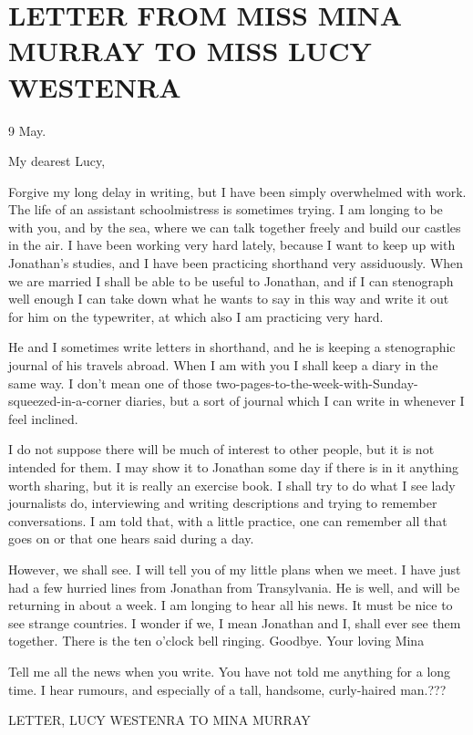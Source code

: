 \chapter{LETTER FROM MISS MINA MURRAY TO MISS LUCY WESTENRA}

9 May. 

My dearest Lucy, 

Forgive my long delay in writing, but I have been simply overwhelmed with work. The life of an assistant schoolmistress is sometimes trying. I am longing to be with you, and by the sea, where we can talk together freely and build our castles in the air. I have been working very hard lately, because I want to keep up with Jonathan's studies, and I have been practicing shorthand very assiduously. When we are married I shall be able to be useful to Jonathan, and if I can stenograph well enough I can take down what he wants to say in this way and write it out for him on the typewriter, at which also I am practicing very hard. 

He and I sometimes write letters in shorthand, and he is keeping a stenographic journal of his travels abroad. When I am with you I shall keep a diary in the same way. I don't mean one of those two-pages-to-the-week-with-Sunday-squeezed-in-a-corner diaries, but a sort of journal which I can write in whenever I feel inclined. 

I do not suppose there will be much of interest to other people, but it is not intended for them. I may show it to Jonathan some day if there is in it anything worth sharing, but it is really an exercise book. I shall try to do what I see lady journalists do, interviewing and writing descriptions and trying to remember conversations. I am told that, with a little practice, one can remember all that goes on or that one hears said during a day. 

However, we shall see. I will tell you of my little plans when we meet. I have just had a few hurried lines from Jonathan from Transylvania. He is well, and will be returning in about a week. I am longing to hear all his news. It must be nice to see strange countries. I wonder if we, I mean Jonathan and I, shall ever see them together. There is the ten o'clock bell ringing. Goodbye. Your loving Mina 

Tell me all the news when you write. You have not told me anything for a long time. I hear rumours, and especially of a tall, handsome, curly-haired man.??? 

LETTER, LUCY WESTENRA TO MINA MURRAY 

